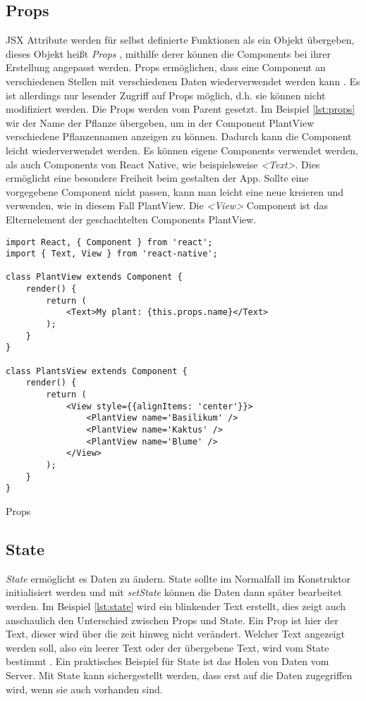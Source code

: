\subsection{Props}
JSX Attribute werden für selbst definierte Funktionen als ein Objekt übergeben, dieses Objekt heißt \textit{Props} \cite{facebook_inc._components_2017}, mithilfe derer können die Components bei ihrer Erstellung angepasst werden. Props ermöglichen, dass eine Component an verschiedenen Stellen mit verschiedenen Daten wiederverwendet werden kann \cite{facebook_inc._props_2017}. Es ist allerdings nur lesender Zugriff auf Props möglich, d.h. sie können nicht modifiziert werden. Die Props werden vom Parent gesetzt. Im Beispiel \ref{lst:props} wir der Name der Pflanze übergeben, um in der Component PlantView verschiedene Pflanzennamen anzeigen zu können. Dadurch kann die Component leicht wiederverwendet werden. Es können eigene Components verwendet werden, als auch Components von React Native, wie beispielsweise \textit{<Text>}. Dies ermöglicht eine besondere Freiheit beim gestalten der App. Sollte eine vorgegebene Component nicht passen, kann man leicht eine neue kreieren und verwenden, wie in diesem Fall PlantView. Die \textit{<View>} Component ist das Elternelement der geschachtelten Components PlantView. 

\begin{listing}[H]
    \begin{verbatim}
import React, { Component } from 'react';
import { Text, View } from 'react-native';

class PlantView extends Component {
    render() {
        return (
            <Text>My plant: {this.props.name}</Text>
        );
    }
}

class PlantsView extends Component {
    render() {
        return (
            <View style={{alignItems: 'center'}}>
                <PlantView name='Basilikum' />
                <PlantView name='Kaktus' />
                <PlantView name='Blume' />
            </View>
        );
    }
}

    \end{verbatim}
    \caption{Props}
    \label{lst:props}
\end{listing}

\subsection{State}
\textit{State} ermöglicht es Daten zu ändern. State sollte im Normalfall im Konstruktor initialisiert werden und mit \textit{setState} können die Daten dann später bearbeitet werden. Im Beispiel \ref{lst:state} wird ein blinkender Text erstellt, dies zeigt auch anschaulich den Unterschied zwischen Props und State. Ein Prop ist hier der Text, dieser wird über die zeit hinweg nicht verändert. Welcher Text angezeigt werden soll, also ein leerer Text oder der übergebene Text, wird vom State bestimmt \cite{facebook_inc._state_2017}. Ein praktisches Beispiel für State ist das Holen von Daten vom Server. Mit State kann sichergestellt werden, dass erst auf die Daten zugegriffen wird, wenn sie auch vorhanden sind. 

